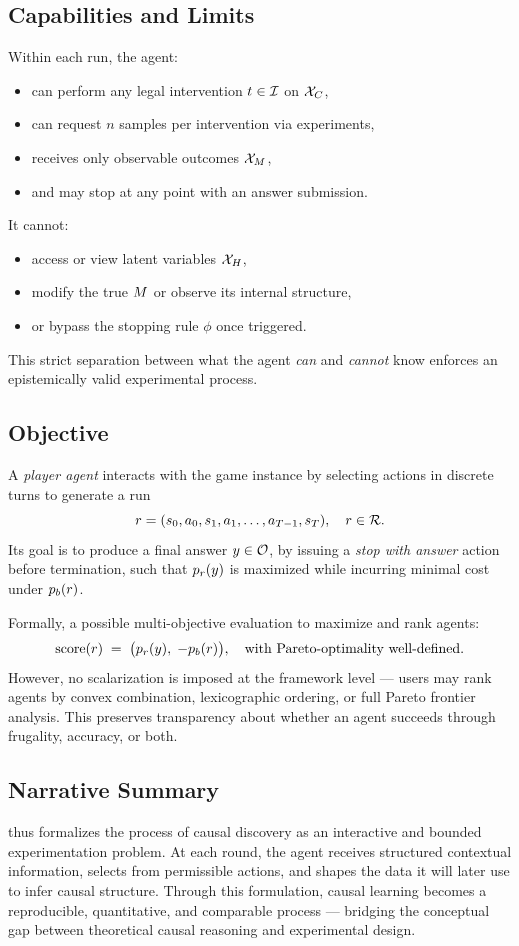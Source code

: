 \subsection{Capabilities and Limits}
Within each run, the agent:
\begin{itemize}
    \item can perform any legal intervention $\intervention \in \interventions$ on $\mathcal{X}_C$,
    \item can request $n$ samples per intervention via experiments,
    \item receives only observable outcomes $\mathcal{X}_M$,
    \item and may stop at any point with an answer submission.
\end{itemize}
It cannot:
\begin{itemize}
    \item access or view latent variables $\mathcal{X}_H$,
    \item modify the true $M$ or observe its internal structure,
    \item or bypass the stopping rule $\phi$ once triggered.
\end{itemize}
This strict separation between what the agent \emph{can} and \emph{cannot} know enforces an epistemically valid experimental process.

\subsection{Objective}
A \emph{player agent} interacts with the game instance by selecting actions in discrete turns to generate a run
\[
    r = (\initstate, a_0, s_1, a_1, \ldots, a_{T-1}, s_T),
    \quad r \in \runs.
\]
Its goal is to produce a final answer $y \in \outputspace$, by issuing a \emph{stop with answer} action before termination, such that $p_r(y)$ is maximized while incurring minimal cost under $p_b(r)$.

Formally, a possible multi-objective evaluation to maximize and rank agents:
\[
    \text{score}(r) \;=\; 
    \big( p_r(y),\; -p_b(r) \big),
\quad \text{with Pareto-optimality well-defined.}
\]
However, no scalarization is imposed at the framework level — users may rank agents by convex combination, lexicographic ordering, or full Pareto frontier analysis. This preserves transparency about whether an agent succeeds through frugality, accuracy, or both.

\subsection{Narrative Summary}
\game thus formalizes the process of causal discovery as an interactive and bounded experimentation problem.  
At each round, the agent receives structured contextual information, selects from permissible actions, and shapes the data it will later use to infer causal structure.  
Through this formulation, causal learning becomes a reproducible, quantitative, and comparable process — bridging the conceptual gap between theoretical causal reasoning and experimental design.
